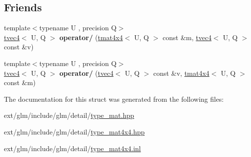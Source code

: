 \subsection*{Friends}
\begin{DoxyCompactItemize}
\item 
\hypertarget{structglm_1_1tmat4x4_a4d1472f6e50839c280a3a7f32396b3f1}{{\footnotesize template$<$typename U , precision Q$>$ }\\\hyperlink{structglm_1_1tvec4}{tvec4}$<$ U, Q $>$ {\bfseries operator/} (\hyperlink{structglm_1_1tmat4x4}{tmat4x4}$<$ U, Q $>$ const \&m, \hyperlink{structglm_1_1tvec4}{tvec4}$<$ U, Q $>$ const \&v)}\label{structglm_1_1tmat4x4_a4d1472f6e50839c280a3a7f32396b3f1}

\item 
\hypertarget{structglm_1_1tmat4x4_a786a67d54520cab5d9ecd91530012ac2}{{\footnotesize template$<$typename U , precision Q$>$ }\\\hyperlink{structglm_1_1tvec4}{tvec4}$<$ U, Q $>$ {\bfseries operator/} (\hyperlink{structglm_1_1tvec4}{tvec4}$<$ U, Q $>$ const \&v, \hyperlink{structglm_1_1tmat4x4}{tmat4x4}$<$ U, Q $>$ const \&m)}\label{structglm_1_1tmat4x4_a786a67d54520cab5d9ecd91530012ac2}

\end{DoxyCompactItemize}


The documentation for this struct was generated from the following files\-:\begin{DoxyCompactItemize}
\item 
ext/glm/include/glm/detail/\hyperlink{type__mat_8hpp}{type\-\_\-mat.\-hpp}\item 
ext/glm/include/glm/detail/\hyperlink{type__mat4x4_8hpp}{type\-\_\-mat4x4.\-hpp}\item 
ext/glm/include/glm/detail/\hyperlink{type__mat4x4_8inl}{type\-\_\-mat4x4.\-inl}\end{DoxyCompactItemize}
